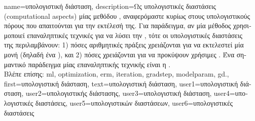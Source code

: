 {name={\foreignlanguage{greek}{υπολογιστική διάσταση}}, 
	description={\foreignlanguage{greek}{Ως υπολογιστικές διαστάσεις} (computational 
		aspects) 
		\foreignlanguage{greek}{μίας μεθόδου} , \foreignlanguage{greek}{αναφερόμαστε κυρίως 
		στους υπολογιστικούς πόρους που απαιτούνται για την εκτέλεσή της. Για παράδειγμα, αν μία μέθοδος} 
		 \foreignlanguage{greek}{χρησιμοποιεί επαναληπτικές τεχνικές}  
		\foreignlanguage{greek}{για να λύσει την} , \foreignlanguage{greek}{τότε οι υπολογιστικές διαστάσεις της 
		περιλαμβάνουν: 1) πόσες αριθμητικές πράξεις χρειάζονται για να εκτελεστεί μία μονή}  
		\foreignlanguage{greek}{(δηλαδή ένα} ), \foreignlanguage{greek}{και 2) πόσες}  
		\foreignlanguage{greek}{χρειάζονται για να προκύψουν χρήσιμες} . 
		\foreignlanguage{greek}{Ένα σημαντικό παράδειγμα μίας επαναληπτικής τεχνικής}  
		\foreignlanguage{greek}{είναι η} .
		\\
		\foreignlanguage{greek}{Βλέπε επίσης:} \gls{ml}, \gls{optimization}, \gls{erm}, \gls{iteration}, \gls{gradstep}, \gls{modelparam}, \gls{gd}.}, 
	first={\foreignlanguage{greek}{υπολογιστική διάσταση}},
	text={\foreignlanguage{greek}{υπολογιστική διάσταση}},
	user1={\foreignlanguage{greek}{υπολογιστική διάσταση}}, %
	user2={\foreignlanguage{greek}{υπολογιστικής διάστασης}}, %
	user3={\foreignlanguage{greek}{υπολογιστική διάσταση}}, %
	user4={\foreignlanguage{greek}{υπολογιστικές διαστάσεις}}, %
	user5={\foreignlanguage{greek}{υπολογιστικών διαστάσεων}}, %
	user6={\foreignlanguage{greek}{υπολογιστικές διαστάσεις}} %
}

